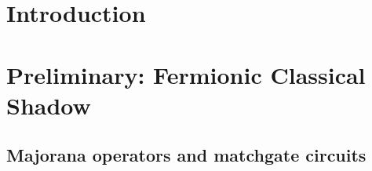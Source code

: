 \documentclass{article}
\begin{document}
\section{Introduction}

\section{Preliminary: Fermionic Classical Shadow}

\subsection{Majorana operators and matchgate circuits}
\end{document}
